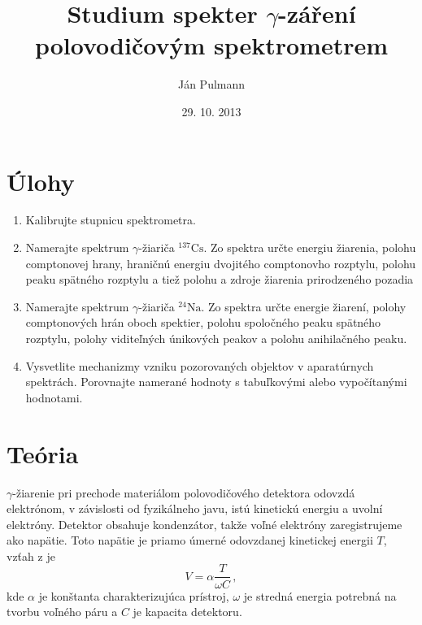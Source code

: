 \documentclass[a4paper, 10pt]{article}
\begin{document}
\title{Studium spekter $\gamma$-záření polovodičovým spektrometrem}
\author{Ján Pulmann}
\date{29. 10. 2013}
\maketitle
\section*{Úlohy}
\begin{enumerate}

	\item Kalibrujte stupnicu spektrometra.
	\item Namerajte spektrum $\gamma$-žiariča $^{137}\mathrm{Cs}$. Zo spektra určte energiu žiarenia, polohu comptonovej hrany, hraničnú energiu dvojitého comptonovho rozptylu, polohu peaku spätného rozptylu a tiež polohu a zdroje žiarenia prirodzeného pozadia
    \item Namerajte spektrum $\gamma$-žiariča $^{24}\mathrm{Na}$. Zo spektra určte energie žiarení, polohy comptonových hrán oboch spektier, polohu spoločného peaku spätného rozptylu, polohy viditeľných únikových peakov a polohu anihilačného peaku.
    \item Vysvetlite mechanizmy vzniku pozorovaných objektov v aparatúrnych spektrách. Porovnajte namerané hodnoty s tabuľkovými alebo vypočítanými hodnotami.
 \end{enumerate}
 
\section*{Teória}
$\gamma$-žiarenie pri prechode materiálom polovodičového detektora odovzdá elektrónom, v závislosti od fyzikálneho javu, istú kinetickú energiu a uvolní elektróny. Detektor obsahuje kondenzátor, takže voľné elektróny zaregistrujeme ako napätie. Toto napätie je priamo úmerné odovzdanej kinetickej energii $T$, vzťah z \cite{stud} je
$$
V = \alpha \frac{T}{\omega C}\,,
$$
kde $\alpha$ je konštanta charakterizujúca prístroj, $\omega$ je stredná energia potrebná na tvorbu voľného páru  a $C$ je kapacita detektoru.
\end{document}
